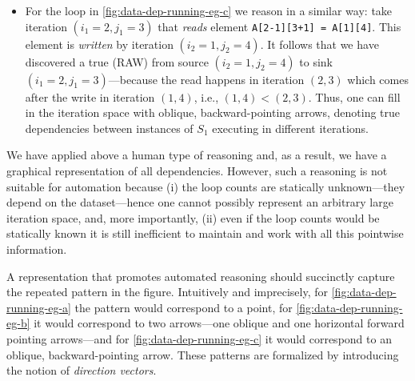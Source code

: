 \begin{itemize}
\item For the loop in \cref{fig:data-dep-running-eg-c} we reason in a
  similar way: take iteration $(i_1=2, j_1=3)$ that \emph{reads}
  element \texttt{A[2-1][3+1] = A[1][4]}. This element is
  \emph{written} by iteration $(i_2=1,j_2=4)$. It follows that we have
  discovered a true (RAW) from source $(i_2=1,j_2=4)$ to sink
  $(i_1=2, j_1=3)$---because the read happens in iteration $(2,3)$
  which comes after the write in iteration $(1,4)$, i.e.,
  $(1,4) < (2,3)$.  Thus, one can fill in the iteration space with
  oblique, backward-pointing arrows, denoting true dependencies
  between instances of $S_1$ executing in different iterations.
\end{itemize}

We have applied above a human type of reasoning and, as a result, we
have a graphical representation of all dependencies. However, such a
reasoning is not suitable for automation because (i) the loop counts
are statically unknown---they depend on the dataset---hence one cannot
possibly represent an arbitrary large iteration space, and, more
importantly, (ii) even if the loop counts would be statically known it
is still inefficient to maintain and work with all this pointwise
information.

A representation that promotes automated reasoning should succinctly
capture the repeated pattern in the figure. Intuitively and
imprecisely, for \cref{fig:data-dep-running-eg-a} the pattern would
correspond to a point, for \cref{fig:data-dep-running-eg-b} it would
correspond to two arrows---one oblique and one horizontal forward
pointing arrows---and for \cref{fig:data-dep-running-eg-c} it would
correspond to an oblique, backward-pointing arrow.
%
These patterns are formalized by introducing the notion of
\emph{direction vectors}.

